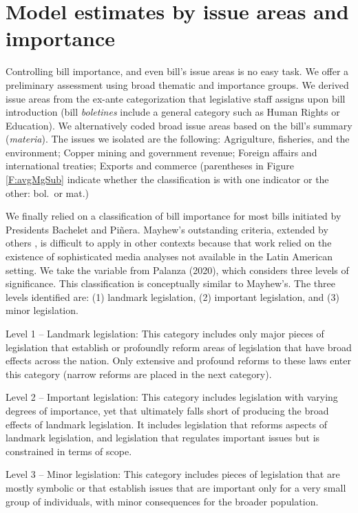 \documentclass[letter,12pt]{article}
\begin{document}
  
\section{Model estimates by issue areas and importance}

Controlling bill importance, and even bill's issue areas is no easy task. We offer a preliminary assessment using broad thematic and importance groups. We derived issue areas from the ex-ante categorization that legislative staff assigns upon bill introduction (bill \emph{boletines} include a general category such as Human Rights or Education). We alternatively coded broad issue areas based on the bill's summary (\emph{materia}). The issues we isolated are the following: Agrigulture, fisheries, and the environment; Copper mining and government revenue; Foreign affairs and international treaties; Exports and commerce (parentheses in Figure \ref{F:avgMgSub} indicate whether the classification is with one indicator or the other: bol.\ or mat.) 

We finally relied on a classification of bill importance for most bills initiated by Presidents Bachelet and Piñera. Mayhew's \citeyearpar{mayhew.1991} outstanding criteria, extended by others \citep[e.g.,]{cameron.2000,clinton.lapinski.2006}, is difficult to apply in other contexts because that work relied on the existence of sophisticated media analyses not available in the Latin American setting. We take the variable from Palanza (2020), which considers three levels of significance. This classification is conceptually similar to Mayhew's. The three levels identified are: (1) landmark legislation, (2) important legislation, and (3) minor legislation. 

Level 1 – Landmark legislation: This category includes only major pieces of legislation that establish or profoundly reform areas of legislation that have broad effects across the nation. Only extensive and profound reforms to these laws enter this category (narrow reforms are placed in the next category). 

Level 2 – Important legislation: This category includes legislation with varying degrees of importance, yet that ultimately falls short of producing the broad effects of landmark legislation. It includes legislation that reforms aspects of landmark legislation, and legislation that regulates important issues but is constrained in terms of scope. 

Level 3 – Minor legislation: This category includes pieces of legislation that are mostly symbolic or that establish issues that are important only for a very small group of individuals, with minor consequences for the broader population. 
\end{document}
